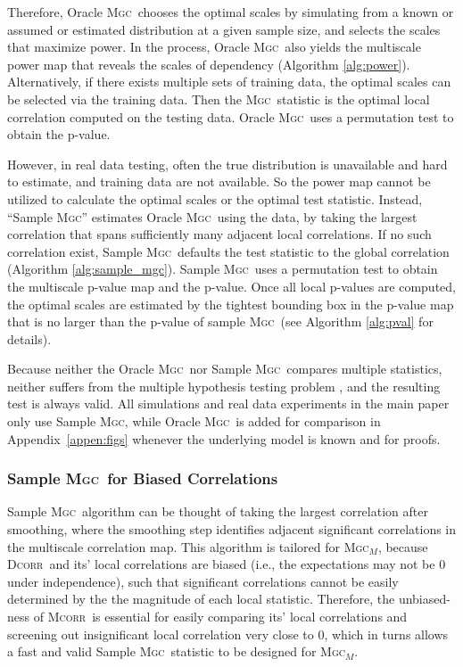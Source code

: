 \documentclass[11pt]{article}
\providecommand{\sct}[1]{{\normalfont\textsc{#1}}}
\newcommand{\Mgc}{\sct{Mgc}}
\newcommand{\Mgcm}{\sct{Mgc$_M$}}
\newcommand{\Dcorr}{\sct{Dcorr}}
\newcommand{\Mcorr}{\sct{Mcorr}}
\begin{document}
Therefore, Oracle \Mgc~chooses the optimal scales by simulating from a known or assumed or estimated distribution at a given sample size, and selects the scales that maximize power. In the process, Oracle \Mgc~also yields the multiscale power map that reveals the scales of dependency (Algorithm \ref{alg:power}). Alternatively, if there exists multiple sets of training data, the optimal scales can be selected via the training data. Then the \Mgc~statistic is the optimal local correlation computed on the testing data. Oracle \Mgc~uses a permutation test to obtain the p-value.

However, in real data testing, often the true distribution is unavailable and hard to estimate, and training data are not available. 
So the power map cannot be utilized to calculate the optimal scales or the optimal test statistic.
Instead,  ``Sample \Mgc''  estimates Oracle \Mgc~using the data, by taking the largest correlation that  spans sufficiently many adjacent local correlations. 
If no such correlation exist, Sample \Mgc~defaults the test statistic to the global correlation (Algorithm \ref{alg:sample_mgc}). 
Sample \Mgc~uses a permutation test to obtain the multiscale p-value map and the p-value. 
% 
Once all local p-values are computed, the optimal scales are estimated by the tightest bounding box in the p-value map that is no larger than the p-value of sample \Mgc~(see Algorithm \ref{alg:pval} for details).  

Because neither the Oracle \Mgc~nor Sample \Mgc~compares multiple statistics, neither suffers from the multiple hypothesis testing problem \cite{Benjamini1995}, and the resulting test is always valid. All simulations and real data experiments in the main paper only use Sample \Mgc, while Oracle \Mgc~is added for comparison in Appendix~\ref{appen:figs} whenever the underlying model is known and for proofs.

\subsubsection*{Sample \Mgc~for Biased Correlations}

Sample \Mgc~algorithm can be thought of taking the largest correlation after smoothing, where the smoothing step identifies adjacent significant correlations in the multiscale correlation map. This algorithm is tailored for \Mgcm, because \Dcorr~and its' local correlations are biased (i.e., the expectations may not be $0$ under independence), such that significant correlations cannot be easily determined by the the magnitude of each local statistic. Therefore, the unbiased-ness of \Mcorr~is essential for easily comparing its' local correlations and screening out insignificant local correlation very close to $0$, which in turns allows a fast and valid Sample \Mgc~statistic to be designed for \Mgcm. 
\end{document}

